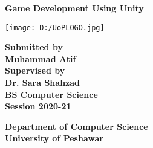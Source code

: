 
	\begin{center}
		
		
		
		{\Large \textbf{Game Development Using Unity}} 
		\vspace{2cm}
		
		
		
		{\texttt{[image: D:/UoPLOGO.jpg]}} 
		
		\vspace{2cm}
		
		{\large \textbf {Submitted by}} \\
		\vspace{0.1cm}
		{\textbf{Muhammad Atif}  }\\
		
		\vspace{2cm}
		{\large\textbf{Supervised by}} \\
		\vspace{0.1cm}
		\textbf{Dr. Sara Shahzad}  \\
		
		\vspace{2cm}
		{\textbf{BS Computer Science}} \\
		\vspace{0.1cm}
		{\textbf{Session 2020-21}}
		
		\vspace{2cm}
		
		{\textbf{Department of Computer Science}}\\
		\vspace{0.1cm}
		{\textbf{University of Peshawar}} 
\thispagestyle{empty}  
	\end{center}
	


